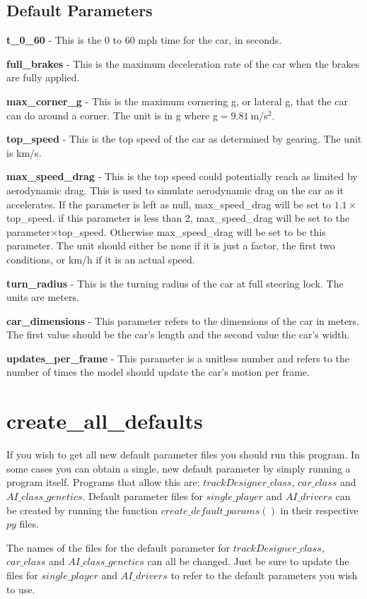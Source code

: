 \documentclass[12pt]{article}
\begin{document}
\subsection{Default Parameters}
\indent\indent\textbf{t\_0\_60} - This is the 0 to 60 mph time for the car, in seconds.

\indent\textbf{full\_brakes} - This is the maximum deceleration rate of the car when the brakes are fully applied.

\indent\textbf{max\_corner\_g} - This is the maximum cornering g, or lateral g, that the car can do around a corner. The unit is in g where g$=9.81\ $m/s$^2$.

\indent\textbf{top\_speed} - This is the top speed of the car as determined by gearing. The unit is km/s.

\indent\textbf{max\_speed\_drag} - This is the top speed could potentially reach as limited by aerodynamic drag. This is used to simulate aerodynamic drag on the car as it accelerates. If the parameter is left as null, max\_speed\_drag will be set to $1.1\times$top\_speed. if this parameter is less than 2, max\_speed\_drag will be set to the parameter$\times$top\_speed. Otherwise max\_speed\_drag will be set to be this parameter. The unit should either be none if it is just a factor, the first two conditions, or km/h if it is an actual speed.

\indent\textbf{turn\_radius} - This is the turning radius of the car at full steering lock. The units are meters.

\indent\textbf{car\_dimensions} - This parameter refers to the dimensions of the car in meters. The first value should be the car's length and the second value the car's width.

\indent\textbf{updates\_per\_frame} - This parameter is a unitless number and refers to the number of times the model should update the car's motion per frame.





\section{create\_all\_defaults}

If you wish to get all new default parameter files you should run this program. In some cases you can obtain a single, new default parameter by simply running a program itself. Programs that allow this are: $trackDesigner\_class$, $car\_class$ and $AI\_class\_genetics$. Default parameter files for $single\_player$ and $AI\_drivers$ can be created by running the function $create\_default\_params()$ in their respective $py$ files.

The names of the files for the default parameter for $trackDesigner\_class$, $car\_class$ and $AI\_class\_genetics$ can all be changed. Just be sure to update the files for $single\_player$ and $AI\_drivers$ to refer to the default parameters you wish to use.






\end{document}
